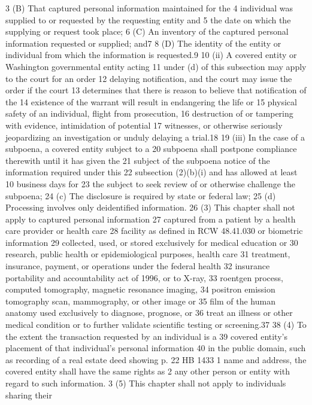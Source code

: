 3 (B) That captured personal information maintained for the
4 individual was supplied to or requested by the requesting entity and
5 the date on which the supplying or request took place;
6 (C) An inventory of the captured personal information requested
or supplied; and7
8 (D) The identity of the entity or individual from which the
information is requested.9
10 (ii) A covered entity or Washington governmental entity acting
11 under (d) of this subsection may apply to the court for an order
12 delaying notification, and the court may issue the order if the court
13 determines that there is reason to believe that notification of the
14 existence of the warrant will result in endangering the life or
15 physical safety of an individual, flight from prosecution,
16 destruction of or tampering with evidence, intimidation of potential
17 witnesses, or otherwise seriously jeopardizing an investigation or
unduly delaying a trial.18
19 (iii) In the case of a subpoena, a covered entity subject to a
20 subpoena shall postpone compliance therewith until it has given the
21 subject of the subpoena notice of the information required under this
22 subsection (2)(b)(i) and has allowed at least 10 business days for
23 the subject to seek review of or otherwise challenge the subpoena;
24 (c) The disclosure is required by state or federal law;
25 (d) Processing involves only deidentified information.
26 (3) This chapter shall not apply to captured personal information
27 captured from a patient by a health care provider or health care
28 facility as defined in RCW 48.41.030 or biometric information
29 collected, used, or stored exclusively for medical education or
30 research, public health or epidemiological purposes, health care
31 treatment, insurance, payment, or operations under the federal health
32 insurance portability and accountability act of 1996, or to X-ray,
33 roentgen process, computed tomography, magnetic resonance imaging,
34 positron emission tomography scan, mammography, or other image or
35 film of the human anatomy used exclusively to diagnose, prognose, or
36 treat an illness or other medical condition or to further validate
scientific testing or screening.37
38 (4) To the extent the transaction requested by an individual is a
39 covered entity's placement of that individual's personal information
40 in the public domain, such as recording of a real estate deed showing
p. 22 HB 1433
1 name and address, the covered entity shall have the same rights as
2 any other person or entity with regard to such information.
3 (5) This chapter shall not apply to individuals sharing their
